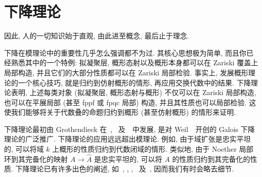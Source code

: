 \section{下降理论}\label{src:3.1}
\begin{epigraph}
因此, 人的一切知识始于直观, 由此进至概念, 最后止于理念.
\end{epigraph}
下降在模理论中的重要性几乎怎么强调都不为过. 其核心思想极为简单, 而且你已经熟悉其中的一个特例: 拟凝聚层, 概形态射以及概形本身都可以在 Zariski 覆盖上局部构造, 并且它们的大部分性质都可以在 Zariski 局部检验. 事实上, 发展概形理论的一个核心技巧, 就是归约到仿射概形的情形, 再应用交换代数中的结果. 下降理论表明, 上述每类对象 (拟凝聚层, 概形态射与概形) 不仅可以在 Zariski 局部构造, 也可以在平展局部 (甚至 fppf 或 fpqc 局部) 构造, 并且其性质也可以局部检验. 这使我们能够将关于代数叠的命题归约到概形 (甚至仿射概形) 的情形来证明.

下降理论最初由 Grothendieck 在~\cite{FGAI}, \cite[§6]{SGA1}~及~\cite[§IV]{EGA}~中发展, 是对 Weil~\cite{Wei56}~开创的 Galois 下降理论的广泛推广. 下降理论的应用远远超出模理论. 例如, 由于域扩张是忠实平坦的, 可以将域 $k$ 上概形的性质归约到代数闭域的情形. 类似地, 由于 Noether 局部环到其完备化的映射 $A\to\widehat A$ 是忠实平坦的, 可以将 $A$ 的性质归约到其完备化的性质. 下降理论已有许多出色的阐述, 如~\cite[§6]{BLR90}, \cite{Vis05}, \cite[第 4 章]{Ols16}, \cite[第 4 章]{Poo17}~及~\cite[Tag 0238]{SP}, 因而我们有时会略去细节.

